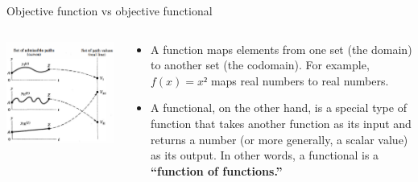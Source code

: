 \documentclass[
  ignorenonframetext,
]{beamer}
\begin{document}
\begin{frame}{Objective function vs objective functional}
\label{objective-function-vs-objective-functional}
\begin{columns}[T]
\begin{column}{0.6\textwidth}
\includegraphics[width=2\textwidth,height=\textheight]{images/do_functional.png}
\end{column}

\begin{column}{0.4\textwidth}
\begin{itemize}
\item
  A function maps elements from one set (the domain) to another set (the
  codomain). For example, \(f(x) = x²\) maps real numbers to real
  numbers.
\item
  A functional, on the other hand, is a special type of function that
  takes another function as its input and returns a number (or more
  generally, a scalar value) as its output. In other words, a functional
  is a \textbf{``function of functions.''}
\end{itemize}
\end{column}
\end{columns}
\end{frame}
\end{document}

